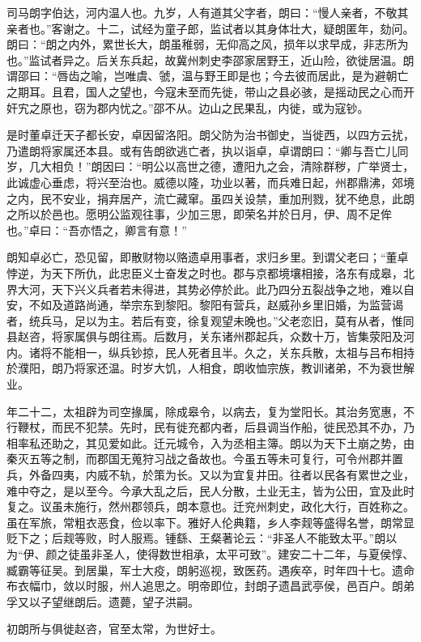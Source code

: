 \documentclass[12pt,UTF8]{ctexbook}
\begin{document}
司马朗字伯达，河内温人也。九岁，人有道其父字者，朗曰：“慢人亲者，不敬其亲者也。”客谢之。十二，试经为童子郎，监试者以其身体壮大，疑朗匿年，劾问。朗曰：“朗之内外，累世长大，朗虽稚弱，无仰高之风，损年以求早成，非志所为也。”监试者异之。后关东兵起，故冀州刺史李邵家居野王，近山险，欲徙居温。朗谓邵曰：“唇齿之喻，岂唯虞、虢，温与野王即是也；今去彼而居此，是为避朝亡之期耳。且君，国人之望也，今寇未至而先徙，带山之县必骇，是摇动民之心而开奸宄之原也，窃为郡内忧之。”邵不从。边山之民果乱，内徙，或为寇钞。

是时董卓迁天子都长安，卓因留洛阳。朗父防为治书御史，当徙西，以四方云扰，乃遣朗将家属还本县。或有告朗欲逃亡者，执以诣卓，卓谓朗曰：“卿与吾亡儿同岁，几大相负！”朗因曰：“明公以高世之德，遭阳九之会，清除群秽，广举贤士，此诚虚心垂虑，将兴至治也。威德以隆，功业以著，而兵难日起，州郡鼎沸，郊境之内，民不安业，捐弃居产，流亡藏窜。虽四关设禁，重加刑戮，犹不绝息，此朗之所以於邑也。愿明公监观往事，少加三思，即荣名并於日月，伊、周不足侔也。”卓曰：“吾亦悟之，卿言有意！”

朗知卓必亡，恐见留，即散财物以赂遗卓用事者，求归乡里。到谓父老曰；“董卓悖逆，为天下所仇，此忠臣义士奋发之时也。郡与京都境壤相接，洛东有成皋，北界大河，天下兴义兵者若未得进，其势必停於此。此乃四分五裂战争之地，难以自安，不如及道路尚通，举宗东到黎阳。黎阳有营兵，赵威孙乡里旧婚，为监营谒者，统兵马，足以为主。若后有变，徐复观望未晚也。”父老恋旧，莫有从者，惟同县赵咨，将家属俱与朗往焉。后数月，关东诸州郡起兵，众数十万，皆集荥阳及河内。诸将不能相一，纵兵钞掠，民人死者且半。久之，关东兵散，太祖与吕布相持於濮阳，朗乃将家还温。时岁大饥，人相食，朗收恤宗族，教训诸弟，不为衰世解业。

年二十二，太祖辟为司空掾属，除成皋令，以病去，复为堂阳长。其治务宽惠，不行鞭杖，而民不犯禁。先时，民有徙充都内者，后县调当作船，徙民恐其不办，乃相率私还助之，其见爱如此。迁元城令，入为丞相主簿。朗以为天下土崩之势，由秦灭五等之制，而郡国无蒐狩习战之备故也。今虽五等未可复行，可令州郡并置兵，外备四夷，内威不轨，於策为长。又以为宜复井田。往者以民各有累世之业，难中夺之，是以至今。今承大乱之后，民人分散，土业无主，皆为公田，宜及此时复之。议虽未施行，然州郡领兵，朗本意也。迁兖州刺史，政化大行，百姓称之。虽在军旅，常粗衣恶食，俭以率下。雅好人伦典籍，乡人李觌等盛得名誉，朗常显贬下之；后觌等败，时人服焉。锺繇、王粲著论云：“非圣人不能致太平。”朗以为“伊、颜之徒虽非圣人，使得数世相承，太平可致”。建安二十二年，与夏侯惇、臧霸等征吴。到居巢，军士大疫，朗躬巡视，致医药。遇疾卒，时年四十七。遗命布衣幅巾，敛以时服，州人追思之。明帝即位，封朗子遗昌武亭侯，邑百户。朗弟孚又以子望继朗后。遗薨，望子洪嗣。

初朗所与俱徙赵咨，官至太常，为世好士。
\end{document}
